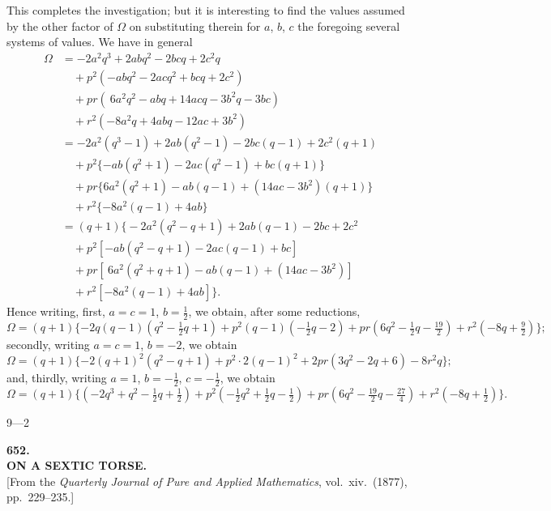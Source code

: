 \documentclass[11pt,a4paper]{article}
\begin{document}
This completes the investigation; but it is interesting to find the values assumed by the other factor of $\Omega$ on substituting therein for $a$, $b$, $c$ the foregoing several systems of values. We have in general
\begin{align*}
\Omega &= -2a^2 q^3 + 2ab q^2 - 2bc q + 2c^2 q \\
 &\quad + p^2 (-ab q^2 - 2ac q^2 + bc q + 2c^2) \\
 &\quad + pr (\ 6a^2 q^2 - ab q + 14ac q - 3b^2 q - 3bc) \\
 &\quad + r^2 (-8a^2 q + 4ab q - 12ac + 3b^2) \\
 &= -2a^2 (q^3 - 1) + 2ab(q^2 - 1) - 2bc(q - 1) + 2c^2(q + 1) \\
 &\quad + p^2 \{-ab(q^2 + 1) - 2ac(q^2 - 1) + bc(q + 1)\} \\
 &\quad + pr \{6a^2(q^2 + 1) - ab(q - 1) + (14ac - 3b^2)(q + 1)\} \\
 &\quad + r^2 \{-8a^2(q - 1) + 4ab\} \\
 &= (q + 1) \big\{ -2a^2(q^2 - q + 1) + 2ab(q - 1) - 2bc + 2c^2 \\
 &\quad + p^2 [-ab(q^2 - q + 1) - 2ac(q - 1) + bc] \\
 &\quad + pr [\ 6a^2(q^2 + q + 1) - ab(q - 1) + (14ac - 3b^2)] \\
 &\quad + r^2 [-8a^2(q - 1) + 4ab] \big\}.
\end{align*}
Hence writing, first, $a = c = 1$, $b = \tfrac{1}{2}$, we obtain, after some reductions,
\[
\Omega = (q + 1)\{-2q(q - 1)(q^2 - \tfrac{1}{2}q + 1) + p^2(q - 1)(-\tfrac{1}{2}q - 2) + pr(6q^2 - \tfrac{1}{2}q - \tfrac{19}{2}) + r^2(-8q + \tfrac{9}{2})\};
\]
secondly, writing $a = c = 1$, $b = -2$, we obtain
\[
\Omega = (q + 1)\{-2(q + 1)^2 (q^2 - q + 1) + p^2 \cdot 2(q - 1)^2 + 2pr(3q^2 - 2q + 6) - 8r^2 q\};
\]
and, thirdly, writing $a = 1$, $b = -\tfrac{1}{2}$, $c = -\tfrac{1}{2}$, we obtain
\[
\Omega = (q + 1)\{(-2q^3 + q^2 - \tfrac{1}{2}q + \tfrac{1}{2}) + p^2 (-\tfrac{1}{2}q^2 + \tfrac{1}{2}q - \tfrac{1}{2}) + pr(6q^2 - \tfrac{19}{2}q - \tfrac{27}{4}) + r^2(-8q + \tfrac{1}{2})\}.
\]

\hfill 9---2

\newpage


\begin{center}
{\Large\bfseries 652.}\\[1em]
{\large\bfseries ON A SEXTIC TORSE.}\\[0.5em]
[From the \textit{Quarterly Journal of Pure and Applied Mathematics}, vol.~xiv.\ (1877), pp.~229--235.]
\end{center}
\end{document}
